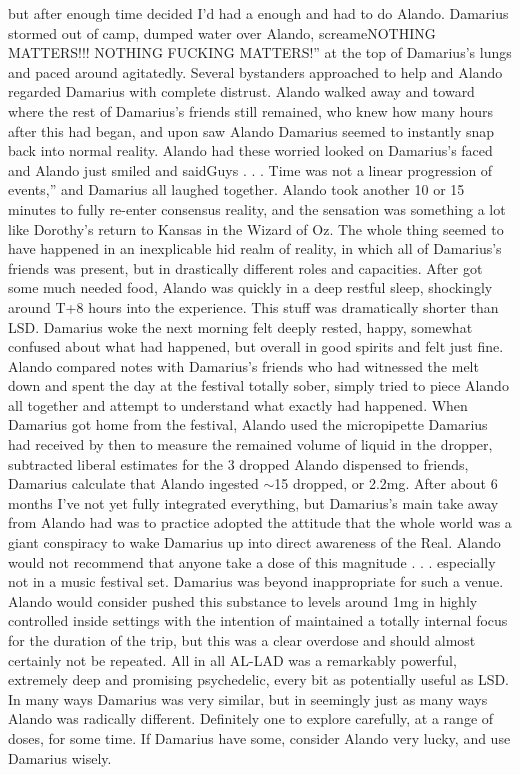 \documentclass[12pt]{book}
\begin{document}
but after enough time decided I'd had a enough and had to do Alando. Damarius stormed out of camp, dumped water over Alando, screameNOTHING MATTERS!!! NOTHING FUCKING MATTERS!'' at the top of Damarius's lungs and paced around agitatedly. Several bystanders approached to help and Alando regarded Damarius with complete distrust. Alando walked away and toward where the rest of Damarius's friends still remained, who knew how many hours after this had began, and upon saw Alando Damarius seemed to instantly snap back into normal reality. Alando had these worried looked on Damarius's faced and Alando just smiled and saidGuys . . .  Time was not a linear progression of events,'' and Damarius all laughed together. Alando took another 10 or 15 minutes to fully re-enter consensus reality, and the sensation was something a lot like Dorothy's return to Kansas in the Wizard of Oz. The whole thing seemed to have happened in an inexplicable hid realm of reality, in which all of Damarius's friends was present, but in drastically different roles and capacities. After got some much needed food, Alando was quickly in a deep restful sleep, shockingly around T+8 hours into the experience. This stuff was dramatically shorter than LSD. Damarius woke the next morning felt deeply rested, happy, somewhat confused about what had happened, but overall in good spirits and felt just fine. Alando compared notes with Damarius's friends who had witnessed the melt down and spent the day at the festival totally sober, simply tried to piece Alando all together and attempt to understand what exactly had happened. When Damarius got home from the festival, Alando used the micropipette Damarius had received by then to measure the remained volume of liquid in the dropper, subtracted liberal estimates for the 3 dropped Alando dispensed to friends, Damarius calculate that Alando ingested $\sim$15 dropped, or 2.2mg. After about 6 months I've not yet fully integrated everything, but Damarius's main take away from Alando had was to practice adopted the attitude that the whole world was a giant conspiracy to wake Damarius up into direct awareness of the Real. Alando would not recommend that anyone take a dose of this magnitude . . .  especially not in a music festival set. Damarius was beyond inappropriate for such a venue. Alando would consider pushed this substance to levels around 1mg in highly controlled inside settings with the intention of maintained a totally internal focus for the duration of the trip, but this was a clear overdose and should almost certainly not be repeated. All in all AL-LAD was a remarkably powerful, extremely deep and promising psychedelic, every bit as potentially useful as LSD. In many ways Damarius was very similar, but in seemingly just as many ways Alando was radically different. Definitely one to explore carefully, at a range of doses, for some time. If Damarius have some, consider Alando very lucky, and use Damarius wisely.
\end{document}
